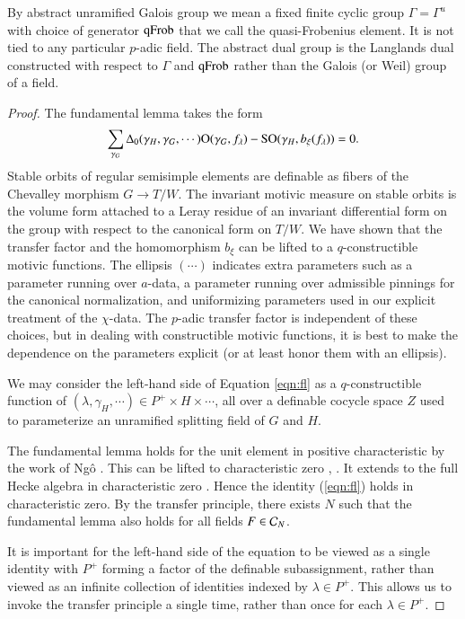 By abstract unramified Galois group we mean a fixed finite cyclic
group $\Gamma=\Gamma^u$ with choice of generator ${\operatorname{qFrob}}$ that we
call the quasi-Frobenius element.  It is not tied to any particular
$p$-adic field.  The abstract dual group is the Langlands dual
constructed with respect to $\Gamma$ and ${\operatorname{qFrob}}$ rather than the
Galois (or Weil) group of a field.


\begin{proof}
  The fundamental lemma takes the form
\begin{equation}\label{eqn:fl}
\sum_{\gamma_G}\Delta_0(\gamma_H,\gamma_G,\cdots)
{\operatorname{O}}(\gamma_G,f_\lambda) - {\operatorname{SO}}(\gamma_H,b_\xi(f_\lambda)) = 0.
\end{equation}
Stable orbits of regular semisimple elements are definable as fibers
of the Chevalley morphism $G\to T/W$.  The invariant motivic measure
on stable orbits is the volume form attached to a Leray residue of an
invariant differential form on the group with respect to the canonical
form on $T/W$.  We have shown that the transfer factor and the
homomorphism $b_\xi$ can be lifted to a $q$-constructible motivic
functions.  The ellipsis $(\cdots)$ indicates extra parameters such as
a parameter running over $a$-data, a parameter running over admissible
pinnings for the canonical normalization, and uniformizing parameters
used in our explicit treatment of the $\chi$-data.  The $p$-adic
transfer factor is independent of these choices, but in dealing with
constructible motivic functions, it is best to make the dependence on
the parameters explicit (or at least honor them with an ellipsis).

We may consider the left-hand side of Equation \ref{eqn:fl} as a
$q$-constructible function of $(\lambda,\gamma_H,\cdots)\in P^+\times
H\times\cdots$, all over a definable cocycle space $Z$ used to
parameterize an unramified splitting field of $G$ and $H$.

The fundamental lemma holds for the unit element in positive
characteristic by the work of Ng\^o \cite{ngo2010lemme}.  This can be
lifted to characteristic zero \cite{cluckers2011transfer},
\cite{waldspurger2006endoscopie}.  It extends to the full Hecke
algebra in characteristic zero \cite{hales1995fundamental}.  Hence the
identity (\ref{eqn:fl}) holds in characteristic zero.  By the transfer
principle, there exists $N$ such that the fundamental lemma also holds
for all fields $F\in\mathcal C_N$.

It is important for the left-hand side of the equation to be viewed as
a single identity with $P^+$ forming a factor of the definable
subassignment, rather than viewed as an infinite collection of
identities indexed by $\lambda\in P^+$.  This allows us to invoke the
transfer principle a single time, rather than once for each
$\lambda\in P^+$.
\end{proof}

